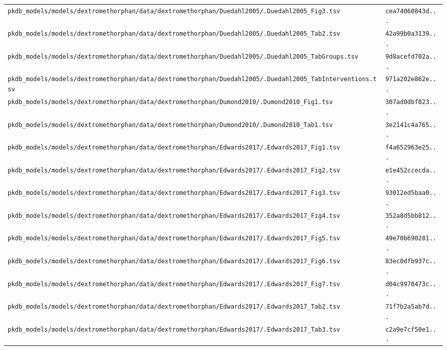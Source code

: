 \begin{longtable}{ll}
\texttt{pkdb\_models/models/dextromethorphan/data/dextromethorphan/Duedahl2005/.Duedahl2005\_Fig3.tsv} & \texttt{cea74060843d...} \\
\texttt{pkdb\_models/models/dextromethorphan/data/dextromethorphan/Duedahl2005/.Duedahl2005\_Tab2.tsv} & \texttt{42a99b0a3139...} \\
\texttt{pkdb\_models/models/dextromethorphan/data/dextromethorphan/Duedahl2005/.Duedahl2005\_TabGroups.tsv} & \texttt{9d8acefd702a...} \\
\texttt{pkdb\_models/models/dextromethorphan/data/dextromethorphan/Duedahl2005/.Duedahl2005\_TabInterventions.tsv} & \texttt{971a202e862e...} \\
\texttt{pkdb\_models/models/dextromethorphan/data/dextromethorphan/Dumond2010/.Dumond2010\_Fig1.tsv} & \texttt{307ad0dbf823...} \\
\texttt{pkdb\_models/models/dextromethorphan/data/dextromethorphan/Dumond2010/.Dumond2010\_Tab1.tsv} & \texttt{3e2141c4a765...} \\
\texttt{pkdb\_models/models/dextromethorphan/data/dextromethorphan/Edwards2017/.Edwards2017\_Fig1.tsv} & \texttt{f4a652963e25...} \\
\texttt{pkdb\_models/models/dextromethorphan/data/dextromethorphan/Edwards2017/.Edwards2017\_Fig2.tsv} & \texttt{e1e452ccecda...} \\
\texttt{pkdb\_models/models/dextromethorphan/data/dextromethorphan/Edwards2017/.Edwards2017\_Fig3.tsv} & \texttt{93012ed5baa0...} \\
\texttt{pkdb\_models/models/dextromethorphan/data/dextromethorphan/Edwards2017/.Edwards2017\_Fig4.tsv} & \texttt{352a8d5bb812...} \\
\texttt{pkdb\_models/models/dextromethorphan/data/dextromethorphan/Edwards2017/.Edwards2017\_Fig5.tsv} & \texttt{49e70b690281...} \\
\texttt{pkdb\_models/models/dextromethorphan/data/dextromethorphan/Edwards2017/.Edwards2017\_Fig6.tsv} & \texttt{83ec0dfb937c...} \\
\texttt{pkdb\_models/models/dextromethorphan/data/dextromethorphan/Edwards2017/.Edwards2017\_Fig7.tsv} & \texttt{d04c9970473c...} \\
\texttt{pkdb\_models/models/dextromethorphan/data/dextromethorphan/Edwards2017/.Edwards2017\_Tab2.tsv} & \texttt{71f7b2a5ab7d...} \\
\texttt{pkdb\_models/models/dextromethorphan/data/dextromethorphan/Edwards2017/.Edwards2017\_Tab3.tsv} & \texttt{c2a9e7cf50e1...} \\

\end{longtable}
